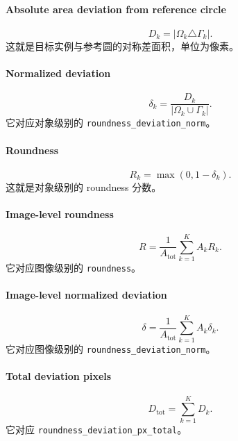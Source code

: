 \documentclass[11pt]{article}
\newcommand{\1}{\mathbf{1}}
\newcommand{\symdiff}{\triangle}
\begin{document}
\paragraph{Absolute area deviation from reference circle}
\begin{equation}
D_k = |\Omega_k \symdiff \Gamma_k|.
\end{equation}
这就是目标实例与参考圆的对称差面积，单位为像素。

\paragraph{Normalized deviation}
\begin{equation}
\delta_k = \frac{D_k}{|\Omega_k \cup \Gamma_k|}.
\end{equation}
它对应对象级别的 \texttt{roundness\_deviation\_norm}。

\paragraph{Roundness}
\begin{equation}
R_k = \max(0, 1-\delta_k).
\end{equation}
这就是对象级别的 roundness 分数。

\paragraph{Image-level roundness}
\begin{equation}
R = \frac{1}{A_{\mathrm{tot}}}\sum_{k=1}^{K} A_k R_k.
\end{equation}
它对应图像级别的 \texttt{roundness}。

\paragraph{Image-level normalized deviation}
\begin{equation}
\delta = \frac{1}{A_{\mathrm{tot}}}\sum_{k=1}^{K} A_k\delta_k.
\end{equation}
它对应图像级别的 \texttt{roundness\_deviation\_norm}。

\paragraph{Total deviation pixels}
\begin{equation}
D_{\mathrm{tot}} = \sum_{k=1}^{K} D_k.
\end{equation}
它对应 \texttt{roundness\_deviation\_px\_total}。
\end{document}
